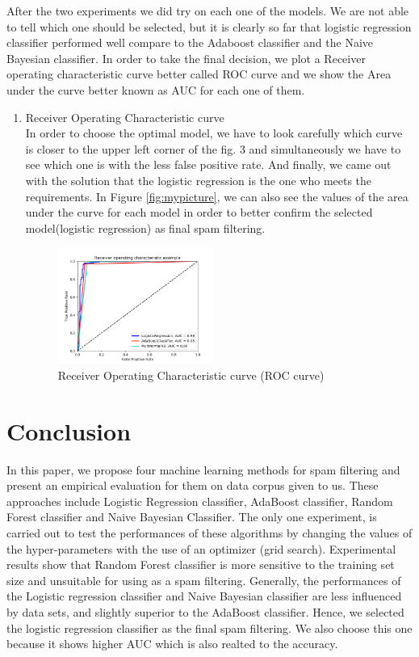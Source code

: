 \documentclass[journal]{IEEEtran}
\begin{document}
After the two experiments we did try on each one of the models. We are not able to tell which one should be selected, but it is clearly so far that logistic regression classifier performed well compare to the Adaboost classifier and the Naive Bayesian classifier. In order to take the final decision, we plot a Receiver operating characteristic curve better called ROC curve and we show the Area under the curve better known as AUC for each one of them.

\begin{enumerate}
\item Receiver Operating Characteristic curve\\
In order to choose the optimal model, we have to look carefully which curve is closer to the upper left corner of the fig. 3 and simultaneously we have to see which one is with the less false positive rate. And finally, we came out with the solution that the logistic regression is the one who meets the requirements. In Figure \ref{fig:mypicture}, we can also see the values of the area under the curve for each model in order to better confirm the selected model(logistic regression) as final spam filtering.

\begin{figure}[!h]
\begin{center}
\includegraphics[width=2in]{roc.png}
\caption{Receiver Operating Characteristic curve (ROC curve)}
\end{center}
\label{fig:mypic}
\end{figure}
\end{enumerate}


\section{Conclusion}

In this paper, we propose four machine learning methods for spam filtering and present an empirical evaluation for them on data corpus given to us. These approaches include Logistic Regression classifier, AdaBoost classifier, Random Forest classifier and Naive Bayesian Classifier. The only one experiment, is carried out to test the performances of these algorithms by changing the values of the hyper-parameters with the use of an optimizer (grid search). Experimental results show that Random Forest classifier is more sensitive to the training set size and unsuitable for using as a spam filtering. Generally, the performances of the Logistic regression classifier and Naive Bayesian classifier are less influenced by data sets, and slightly superior to the AdaBoost classifier. Hence, we selected the logistic regression classifier as the final spam filtering. We also choose this one because it shows higher AUC which is also realted to the accuracy.
\end{document}
